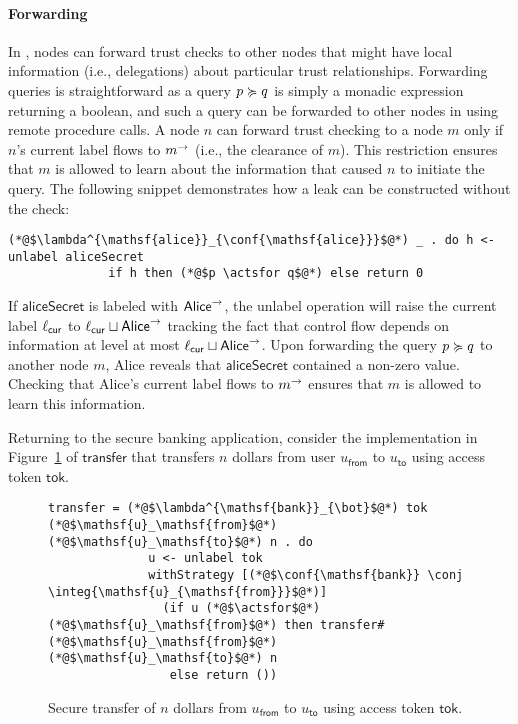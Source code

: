 \paragraph{Forwarding}
In \lang{}, nodes can forward trust checks to other nodes that might have local information (i.e., delegations) about particular trust relationships. Forwarding queries is straightforward as a query $p \succcurlyeq q$ is simply a monadic expression returning a boolean, and such a query can be forwarded to other nodes in \lang{} using remote procedure calls.
A node $n$ can forward trust checking to a node $m$ only if $n$'s current label flows to $m^{\rightarrow}$ (i.e., the clearance of $m$). This restriction ensures that $m$ is allowed to learn about the information that caused $n$ to initiate the query.  The following snippet demonstrates how a leak can be constructed without the check:
\begin{lstlisting}
(*@$\lambda^{\mathsf{alice}}_{\conf{\mathsf{alice}}}$@*) _ . do h <- unlabel aliceSecret
              if h then (*@$p \actsfor q$@*) else return 0
\end{lstlisting}
If $\mathsf{aliceSecret}$ is labeled with $\mathsf{Alice}^{\rightarrow}$, the unlabel operation will raise the current label $\ell_{\mathsf{cur}}$ to $\ell_{\mathsf{cur}} \sqcup \mathsf{Alice}^{\rightarrow}$ tracking the fact that control flow depends on information at level at most $\ell_{\mathsf{cur}} \sqcup \mathsf{Alice}^{\rightarrow}$. Upon forwarding the query $p \succcurlyeq q$ to another node $m$, Alice reveals that $\mathsf{aliceSecret}$ contained a non-zero value. Checking that Alice's current label flows to $m^{\rightarrow}$ ensures that $m$ is allowed to learn this information.

Returning to the secure banking application, consider the implementation in Figure~\ref{fig:sec-transfer} of $\mathsf{transfer}$ that transfers $n$ dollars from user $u_\mathsf{from}$ to $u_\mathsf{to}$ using access token $\mathsf{tok}$.

\begin{figure}
\centering
\begin{lstlisting}
transfer = (*@$\lambda^{\mathsf{bank}}_{\bot}$@*) tok (*@$\mathsf{u}_\mathsf{from}$@*) (*@$\mathsf{u}_\mathsf{to}$@*) n . do
              u <- unlabel tok
              withStrategy [(*@$\conf{\mathsf{bank}} \conj \integ{\mathsf{u}_{\mathsf{from}}}$@*)]
                (if u (*@$\actsfor$@*) (*@$\mathsf{u}_\mathsf{from}$@*) then transfer# (*@$\mathsf{u}_\mathsf{from}$@*) (*@$\mathsf{u}_\mathsf{to}$@*) n
                 else return ())
\end{lstlisting}
\caption{Secure transfer of $n$ dollars from $u_{\mathsf{from}}$ to $u_{\mathsf{to}}$ using access token $\mathsf{tok}$.}
\label{fig:sec-transfer}
\end{figure}

